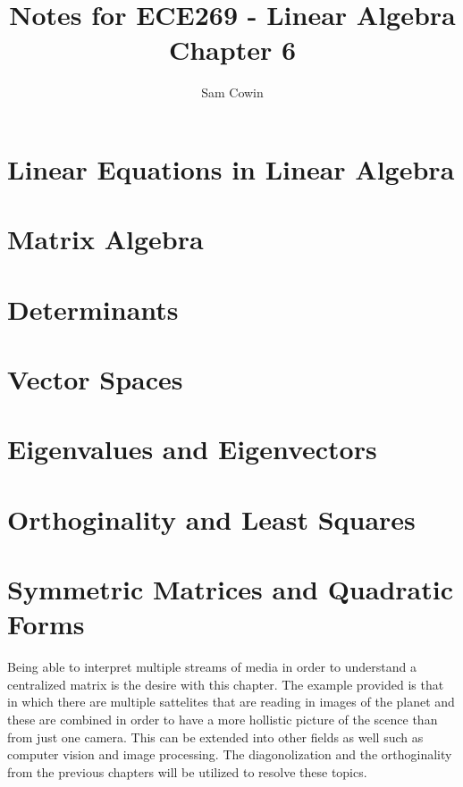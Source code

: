 \documentclass[12pt]{article}
\begin{document}
\setlength{\abovedisplayskip}{0pt}
\setlength{\belowdisplayskip}{0pt}
\setlength{\abovedisplayshortskip}{0pt}
\setlength{\belowdisplayshortskip}{0pt}

\title{Notes for ECE269 - Linear Algebra \\
\large Chapter 6}
\author{Sam Cowin}
\maketitle

\section{Linear Equations in Linear Algebra}
\section{Matrix Algebra}
\section{Determinants}
\section{Vector Spaces}
\section{Eigenvalues and Eigenvectors}
\section{Orthoginality and Least Squares}
\section{Symmetric Matrices and Quadratic Forms}
Being able to interpret multiple streams of media in order to understand a centralized matrix is the desire with this chapter. The example provided is that in which there are 
multiple sattelites that are reading in images of the planet and these are combined in order to have a more hollistic picture of the scence than from just one camera. This can be 
extended into other fields as well such as computer vision and image processing. The diagonolization and the orthoginality from the previous chapters will be utilized to 
resolve these topics. 
\end{document}
